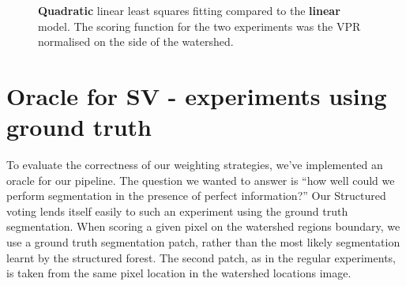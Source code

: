 \begin{figure}[ht!]
\centering
\caption[Quadratic linear least squares fitting compared to the linear model - plots]{{\bf Quadratic} linear least squares fitting compared to the {\bf linear} model. The scoring function for the two experiments was the VPR normalised on the side of the watershed.}
\label{fig:SE-quadratic}
\end{figure}

\section[Oracle for Structured voting]{Oracle for SV - experiments using ground truth}
\label{sec:ch5-oracle}
To evaluate the correctness of our weighting strategies, we've implemented an oracle for our pipeline. The question we wanted to answer is ``how well could we perform segmentation in the presence of perfect information?'' Our Structured voting lends itself easily to such an experiment using the ground truth segmentation. 
When scoring a given pixel on the watershed regions boundary, we use a ground truth segmentation patch, rather than the most likely segmentation learnt by the structured forest. The second patch, as in the regular experiments, is taken from the same pixel location in the watershed locations image.

